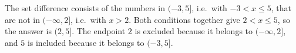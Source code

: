 The set difference consists of the numbers in $(-3,5]$, i.e.\ with $-3<x\le5$, that are not in $(-\infty,2]$, i.e.\ with $x>2$. Both conditions together give $2<x\le5$, so the answer is $\boxed{(2,5]}$. The endpoint $2$ is excluded because it belongs to $(-\infty,2]$, and $5$ is included because it belongs to $(-3,5]$.
